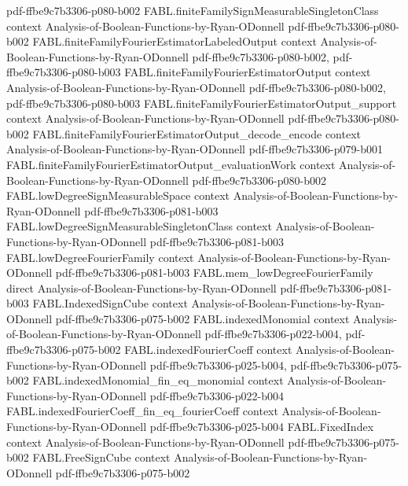 \begin{theorem}
  {pdf-ffbe9c7b3306-p080-b002}
\proofstep
  {FABL.finiteFamilySignMeasurableSingletonClass}
  {context}
  {Analysis-of-Boolean-Functions-by-Ryan-ODonnell}
  {pdf-ffbe9c7b3306-p080-b002}
\proofstep
  {FABL.finiteFamilyFourierEstimatorLabeledOutput}
  {context}
  {Analysis-of-Boolean-Functions-by-Ryan-ODonnell}
  {pdf-ffbe9c7b3306-p080-b002,
    pdf-ffbe9c7b3306-p080-b003}
\proofstep
  {FABL.finiteFamilyFourierEstimatorOutput}
  {context}
  {Analysis-of-Boolean-Functions-by-Ryan-ODonnell}
  {pdf-ffbe9c7b3306-p080-b002,
    pdf-ffbe9c7b3306-p080-b003}
\proofstep
  {FABL.finiteFamilyFourierEstimatorOutput_support}
  {context}
  {Analysis-of-Boolean-Functions-by-Ryan-ODonnell}
  {pdf-ffbe9c7b3306-p080-b002}
\proofstep
  {FABL.finiteFamilyFourierEstimatorOutput_decode_encode}
  {context}
  {Analysis-of-Boolean-Functions-by-Ryan-ODonnell}
  {pdf-ffbe9c7b3306-p079-b001}
\proofstep
  {FABL.finiteFamilyFourierEstimatorOutput_evaluationWork}
  {context}
  {Analysis-of-Boolean-Functions-by-Ryan-ODonnell}
  {pdf-ffbe9c7b3306-p080-b002}
\proofstep
  {FABL.lowDegreeSignMeasurableSpace}
  {context}
  {Analysis-of-Boolean-Functions-by-Ryan-ODonnell}
  {pdf-ffbe9c7b3306-p081-b003}
\proofstep
  {FABL.lowDegreeSignMeasurableSingletonClass}
  {context}
  {Analysis-of-Boolean-Functions-by-Ryan-ODonnell}
  {pdf-ffbe9c7b3306-p081-b003}
\proofstep
  {FABL.lowDegreeFourierFamily}
  {context}
  {Analysis-of-Boolean-Functions-by-Ryan-ODonnell}
  {pdf-ffbe9c7b3306-p081-b003}
\proofstep
  {FABL.mem_lowDegreeFourierFamily}
  {direct}
  {Analysis-of-Boolean-Functions-by-Ryan-ODonnell}
  {pdf-ffbe9c7b3306-p081-b003}
\proofstep
  {FABL.IndexedSignCube}
  {context}
  {Analysis-of-Boolean-Functions-by-Ryan-ODonnell}
  {pdf-ffbe9c7b3306-p075-b002}
\proofstep
  {FABL.indexedMonomial}
  {context}
  {Analysis-of-Boolean-Functions-by-Ryan-ODonnell}
  {pdf-ffbe9c7b3306-p022-b004,
    pdf-ffbe9c7b3306-p075-b002}
\proofstep
  {FABL.indexedFourierCoeff}
  {context}
  {Analysis-of-Boolean-Functions-by-Ryan-ODonnell}
  {pdf-ffbe9c7b3306-p025-b004,
    pdf-ffbe9c7b3306-p075-b002}
\proofstep
  {FABL.indexedMonomial_fin_eq_monomial}
  {context}
  {Analysis-of-Boolean-Functions-by-Ryan-ODonnell}
  {pdf-ffbe9c7b3306-p022-b004}
\proofstep
  {FABL.indexedFourierCoeff_fin_eq_fourierCoeff}
  {context}
  {Analysis-of-Boolean-Functions-by-Ryan-ODonnell}
  {pdf-ffbe9c7b3306-p025-b004}
\proofstep
  {FABL.FixedIndex}
  {context}
  {Analysis-of-Boolean-Functions-by-Ryan-ODonnell}
  {pdf-ffbe9c7b3306-p075-b002}
\proofstep
  {FABL.FreeSignCube}
  {context}
  {Analysis-of-Boolean-Functions-by-Ryan-ODonnell}
  {pdf-ffbe9c7b3306-p075-b002}

\end{theorem}
